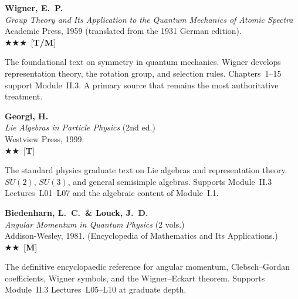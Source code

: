 \documentclass[11pt,a4paper]{article}
\newcommand{\essential}{$\bigstar\bigstar\bigstar$}
\newcommand{\recommended}{$\bigstar\bigstar$}
\newenvironment{bibentry}[1]{\begin{tcolorbox}[entrybox=#1,top=4pt,bottom=4pt]}{\end{tcolorbox}\smallskip}
\begin{document}
\begin{bibentry}{t4light}
\textbf{Wigner, E.~P.}\\
\textit{Group Theory and Its Application to the Quantum Mechanics of Atomic Spectra}\\
Academic Press, 1959 (translated from the 1931 German edition).\\[3pt]
\essential\ [\textbf{T/M}]\\[3pt]
\begin{tcolorbox}[annotbox]
The foundational text on symmetry in quantum mechanics. Wigner develops representation
theory, the rotation group, and selection rules. Chapters~1--15 support Module~II.3.
A primary source that remains the most authoritative treatment.
\end{tcolorbox}
\end{bibentry}

\begin{bibentry}{t4light}
\textbf{Georgi, H.}\\
\textit{Lie Algebras in Particle Physics} (2nd ed.)\\
Westview Press, 1999.\\[3pt]
\recommended\ [\textbf{T}]\\[3pt]
\begin{tcolorbox}[annotbox]
The standard physics graduate text on Lie algebras and representation theory.
$SU(2)$, $SU(3)$, and general semisimple algebras. Supports Module~II.3 Lectures~L01--L07
and the algebraic content of Module~I.1.
\end{tcolorbox}
\end{bibentry}

\begin{bibentry}{t4light}
\textbf{Biedenharn, L.~C.\ \& Louck, J.~D.}\\
\textit{Angular Momentum in Quantum Physics} (2 vols.)\\
Addison-Wesley, 1981. (Encyclopedia of Mathematics and Its Applications.)\\[3pt]
\recommended\ [\textbf{M}]\\[3pt]
\begin{tcolorbox}[annotbox]
The definitive encyclopaedic reference for angular momentum, Clebsch--Gordan
coefficients, Wigner symbols, and the Wigner--Eckart theorem. Supports
Module~II.3 Lectures~L05--L10 at graduate depth.
\end{tcolorbox}
\end{bibentry}

\end{document}
